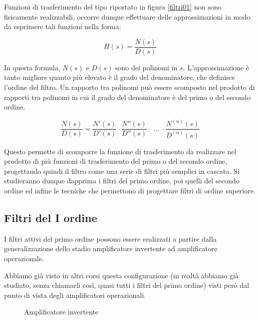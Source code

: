 \documentclass[../main.tex]{subfiles}
\begin{document}
Funzioni di trasferimento del tipo riportato in figura \ref{filtri01} non sono fisicamente realizzabili, occorre dunque effettuare delle approssimazioni in modo da esprimere tali funzioni nella forma:

\begin{equation}
	H(s) = \frac{N(s)}{D(s)}
\end{equation}

In questa formula, $N(s)$ e $D(s)$ sono dei polinomi in $s$. L’approssimazione è tanto migliore quanto più elevato è il grado del denominatore, che definisce l’ordine del filtro. Un rapporto tra polinomi può essere scomposto nel prodotto di rapporti tra polinomi in cui il grado del denominatore è del primo o del secondo ordine.

\begin{equation}
	\frac{N(s)}{D(s)} = \frac{N'(s)}{D'(s)} \cdot \frac{N''(s)}{D''(s)} \cdot \;\dots \; \cdot \frac{N^{(n)}(s)}{D^{(n)}(s)}
\end{equation}

Questo permette di scomporre la funzione di trasferimento da realizzare nel prodotto di più funzioni di trasferimento del primo o del secondo ordine, progettando quindi il filtro come una serie di filtri più semplici in cascata. Si studieranno dunque dapprima i filtri del primo ordine, poi quelli del secondo ordine ed infine le tecniche che permettono di progettare filtri di ordine superiore.

\subsection{Filtri del I ordine}

I filtri attivi del primo ordine possono essere realizzati a partire dalla generalizzazione dello stadio amplificatore invertente ad amplificatore operazionale.

Abbiamo già visto in altri corsi questa configurazione (in realtà abbiamo già studiato, senza chiamarli così, quasi tutti i filtri del primo ordine) visti però dal punto di vista degli amplificatori operazionali.


\begin{figure}
\begin{center}


\label{filtri02}
\caption{Amplificatore invertente}	
\end{center}	
\end{figure}
\end{document}
